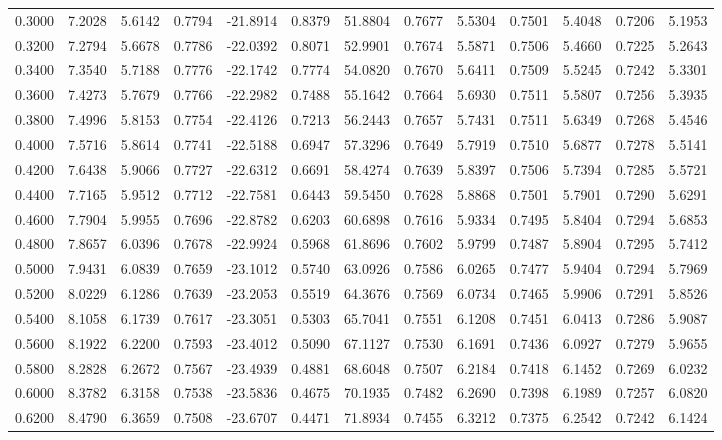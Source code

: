 \begin{tabular}{rrrrrrrrrrrrr}
0.3000 & 7.2028 & 5.6142 & 0.7794 & -21.8914 & 0.8379 & 51.8804 & 0.7677 & 5.5304 & 0.7501 & 5.4048 & 0.7206 & 5.1953 \\
0.3200 & 7.2794 & 5.6678 & 0.7786 & -22.0392 & 0.8071 & 52.9901 & 0.7674 & 5.5871 & 0.7506 & 5.4660 & 0.7225 & 5.2643 \\
0.3400 & 7.3540 & 5.7188 & 0.7776 & -22.1742 & 0.7774 & 54.0820 & 0.7670 & 5.6411 & 0.7509 & 5.5245 & 0.7242 & 5.3301 \\
0.3600 & 7.4273 & 5.7679 & 0.7766 & -22.2982 & 0.7488 & 55.1642 & 0.7664 & 5.6930 & 0.7511 & 5.5807 & 0.7256 & 5.3935 \\
0.3800 & 7.4996 & 5.8153 & 0.7754 & -22.4126 & 0.7213 & 56.2443 & 0.7657 & 5.7431 & 0.7511 & 5.6349 & 0.7268 & 5.4546 \\
0.4000 & 7.5716 & 5.8614 & 0.7741 & -22.5188 & 0.6947 & 57.3296 & 0.7649 & 5.7919 & 0.7510 & 5.6877 & 0.7278 & 5.5141 \\
0.4200 & 7.6438 & 5.9066 & 0.7727 & -22.6312 & 0.6691 & 58.4274 & 0.7639 & 5.8397 & 0.7506 & 5.7394 & 0.7285 & 5.5721 \\
0.4400 & 7.7165 & 5.9512 & 0.7712 & -22.7581 & 0.6443 & 59.5450 & 0.7628 & 5.8868 & 0.7501 & 5.7901 & 0.7290 & 5.6291 \\
0.4600 & 7.7904 & 5.9955 & 0.7696 & -22.8782 & 0.6203 & 60.6898 & 0.7616 & 5.9334 & 0.7495 & 5.8404 & 0.7294 & 5.6853 \\
0.4800 & 7.8657 & 6.0396 & 0.7678 & -22.9924 & 0.5968 & 61.8696 & 0.7602 & 5.9799 & 0.7487 & 5.8904 & 0.7295 & 5.7412 \\
0.5000 & 7.9431 & 6.0839 & 0.7659 & -23.1012 & 0.5740 & 63.0926 & 0.7586 & 6.0265 & 0.7477 & 5.9404 & 0.7294 & 5.7969 \\
0.5200 & 8.0229 & 6.1286 & 0.7639 & -23.2053 & 0.5519 & 64.3676 & 0.7569 & 6.0734 & 0.7465 & 5.9906 & 0.7291 & 5.8526 \\
0.5400 & 8.1058 & 6.1739 & 0.7617 & -23.3051 & 0.5303 & 65.7041 & 0.7551 & 6.1208 & 0.7451 & 6.0413 & 0.7286 & 5.9087 \\
0.5600 & 8.1922 & 6.2200 & 0.7593 & -23.4012 & 0.5090 & 67.1127 & 0.7530 & 6.1691 & 0.7436 & 6.0927 & 0.7279 & 5.9655 \\
0.5800 & 8.2828 & 6.2672 & 0.7567 & -23.4939 & 0.4881 & 68.6048 & 0.7507 & 6.2184 & 0.7418 & 6.1452 & 0.7269 & 6.0232 \\
0.6000 & 8.3782 & 6.3158 & 0.7538 & -23.5836 & 0.4675 & 70.1935 & 0.7482 & 6.2690 & 0.7398 & 6.1989 & 0.7257 & 6.0820 \\
0.6200 & 8.4790 & 6.3659 & 0.7508 & -23.6707 & 0.4471 & 71.8934 & 0.7455 & 6.3212 & 0.7375 & 6.2542 & 0.7242 & 6.1424 \\

\end{tabular}
